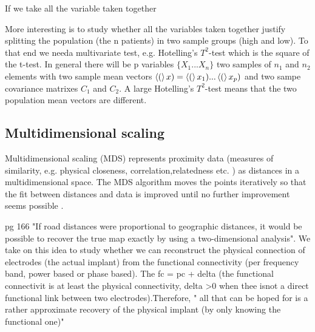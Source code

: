 \documentclass[11pt, onecolumn]{article}
\begin{document}
If we take all the variable taken together 





More interesting is to study whether all the variables taken together justify splitting the population (the n patients) in two sample groups (high and low). To that end we needa multivariate test, e.g. Hotelling's $T^2$-test which is  the square of the t-test.
In general there will be p variables $\{X_1 ... X_n\}$ two samples of $n_1$ and $n_2$ elements with two sample mean vectors $\left< ( \right>x) = \left< ( \right>x_1) ...\left< ( \right>x_p)$ and two sampe covariance matrixes $C_1$ and $C_2$.   A large Hotelling's $T^2$-test means that the two population mean vectors are different. 

\subsection*{Multidimensional scaling}
Multidimensional scaling (MDS) represents proximity data (measures of similarity, e.g. physical closeness, correlation,relatedness etc. ) as distances in a multidimensional space. The MDS algorithm moves the points iteratively so that the fit between distances and data is improved until no further improvement seems possible \citep{borg_modern_2005}.


pg 166 "If road distances were proportional to geographic distances, it would be possible to recover the true map exactly by using a two-dimensional analysis". We take on this idea to study whether we can reconstruct the physical connection of electrodes (the actual implant) from the functional connectivity (per frequency band, power based or phase based). The fc = pc + delta (the functional connectivit is at least the physical connectivity, delta >0 when thee isnot a direct functional link between two electrodes).Therefore, "
all that can be hoped for is a rather approximate recovery of the
physical implant (by only knowing the functional one)" \citep{manly_multivariate_2004}

\end{document}

